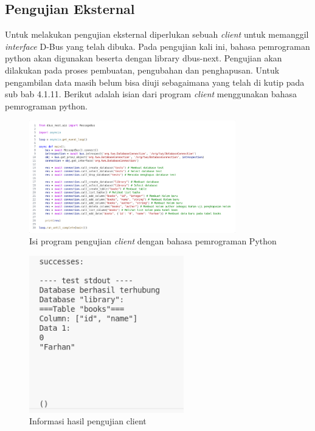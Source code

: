 \subsection{Pengujian Eksternal}
Untuk melakukan pengujian eksternal diperlukan sebuah \emph{client} untuk memanggil \emph{interface} D-Bus yang telah dibuka. Pada pengujian kali ini, bahasa pemrograman python akan
digunakan beserta dengan library dbus-next. Pengujian akan dilakukan pada proses pembuatan, pengubahan dan penghapusan. Untuk pengambilan data masih belum bisa diuji
sebagaimana yang telah di kutip pada sub bab 4.1.11. Berikut adalah isian dari program \emph{client} menggunakan bahasa pemrograman python.

 \begin{figure}[H]
  	\centering{}
	\includegraphics[width=0.8\textwidth]{gambar/bab4/uji-client.png}
  	\caption{Isi program pengujian \emph{client} dengan bahasa pemrograman Python}
   \end{figure}

    \begin{figure}[H]
  	\centering{}
	\includegraphics[width=0.6\textwidth]{gambar/bab4/hasil-uji-client.png}
  	\caption{Informasi hasil pengujian client}
   \end{figure}

